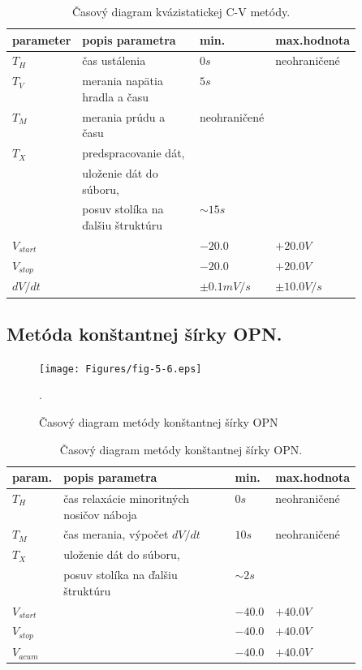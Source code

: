 \begin{table}[h!]\centering
  \begin{tabular}{ l p{0.5\linewidth} l l }
    parameter   & popis parametra & min. & max.hodnota\\
    \hline
    $T_H$       & čas ustálenia \dotfill & $0 s$ & neohraničené\\
    $T_V$       & merania napätia hradla a času \dotfill & $5 s$\\
    $T_M$       & merania prúdu a času \dotfill & neohraničené\\
    $T_X$       & predspracovanie dát,\\
                & uloženie dát do súboru,\\
                & posuv stolíka na ďalšiu štruktúru \dotfill & $\sim 15s$\\
    $V_{start}$ & \dotfill & $-20.0$ & $+20.0 V$\\
    $V_{stop}$  & \dotfill & $-20.0$ & $+20.0 V$\\
    $dV/dt$     & \dotfill & $\pm 0.1mV/s$ & $\pm 10.0V/s$\\
    \hline
  \end{tabular}
  \caption[Časový diagram kvázistatickej C-V metódy]{Časový diagram
    kvázistatickej C-V metódy.}\label{tab:5.3}
\end{table}

\newpage
\subsection{Metóda konštantnej šírky OPN.}\label{sec:5.4.4}

\begin{figure}[h!]\centering
  \texttt{[image: Figures/fig-5-6.eps]}
  \caption[Časový diagram metódy konštantnej šírky OPN]{Časový diagram
    metódy konštantnej šírky OPN}.\label{fig:5.6}
\end{figure}

\begin{table}[h!]\centering
  \begin{tabular}{ l p{0.5\linewidth} l l }
    param.      & popis parametra & min. & max.hodnota\\
    \hline
    $T_H$       & čas relaxácie minoritných nosičov náboja \dotfill & $0 s$ & neohraničené\\
    $T_M$       & čas merania, výpočet $dV/dt$ \dotfill & $10 s$ & neohraničené\\
    $T_X$       & uloženie dát do súboru,\\
                & posuv stolíka na ďalšiu štruktúru \dotfill & $\sim 2s$\\
    $V_{start}$ & \dotfill & $-40.0$ & $+40.0 V$\\
    $V_{stop}$  & \dotfill & $-40.0$ & $+40.0 V$\\
    $V_{acum}$  & \dotfill & $-40.0$ & $+40.0 V$\\
    \hline
  \end{tabular}
  \caption[Časový diagram metódy konštantnej šírky OPN]{Časový diagram
    metódy konštantnej šírky OPN.}\label{tab:5.4}
\end{table}


